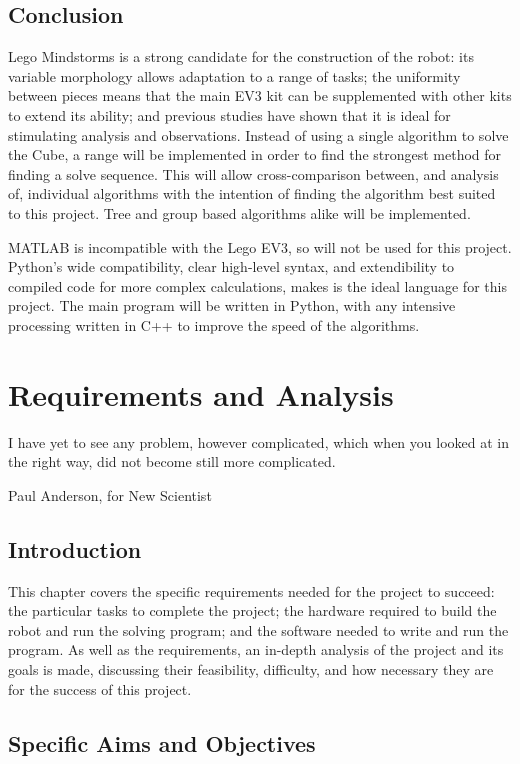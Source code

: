 \documentclass{report}
\begin{document}
    \section{Conclusion}
    Lego Mindstorms is a strong candidate for the construction of the robot: its variable morphology allows adaptation to a range of tasks; the uniformity between pieces means that the main EV3 kit can be supplemented with other kits to extend its ability; and previous studies have shown that it is ideal for stimulating analysis and observations. Instead of using a single algorithm to solve the Cube, a range will be implemented in order to find the strongest method for finding a solve sequence. This will allow cross-comparison between, and analysis of, individual algorithms with the intention of finding the algorithm best suited to this project. Tree and group based algorithms alike will be implemented.
    
    MATLAB is incompatible with the Lego EV3, so will not be used for this project. Python's wide compatibility, clear high-level syntax, and extendibility to compiled code for more complex calculations, makes is the ideal language for this project. The main program will be written in Python, with any intensive processing written in C++ to improve the speed of the algorithms.
   
    \newpage
    \chapter{Requirements and Analysis}
    \epigraph{I have yet to see any problem, however complicated, which when you looked at in the right way, did not become still more complicated.}{Paul Anderson, for New Scientist \cite{Anderson1969}}
    
    \section{Introduction} %
    This chapter covers the specific requirements needed for the project to succeed: the particular tasks to complete the project; the hardware required to build the robot and run the solving program; and the software needed to write and run the program. As well as the requirements, an in-depth analysis of the project and its goals is made, discussing their feasibility, difficulty, and how necessary they are for the success of this project.
    
    \section{Specific Aims and Objectives} \label{sec:objectives}
    
\end{document}
